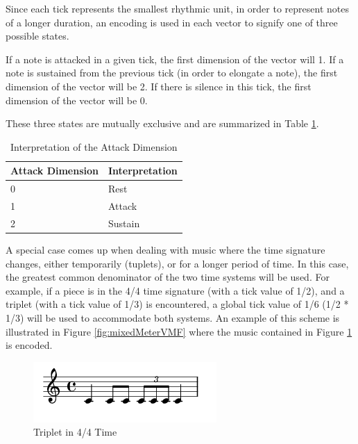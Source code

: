 Since each tick represents the smallest rhythmic unit, in order to represent notes of a longer duration, an encoding is used in each vector to signify one of three possible states.

If a note is attacked in a given tick, the first dimension of the vector will 1. If a note is sustained from the previous tick (in order to elongate a note), the first dimension of the vector will be 2. If there is silence in this tick, the first dimension of the vector will be 0.

These three states are mutually exclusive and are summarized in Table \ref{tab:attackBits}.

\begin{table}[h]
  \centering
  \begin{tabular}{ll}
  Attack Dimension & Interpretation \\ \hline
  0          & Rest             \\
  1          & Attack              \\
  2          & Sustain           \\
  \end{tabular}
  \caption{Interpretation of the Attack Dimension}
  \label{tab:attackBits}
\end{table}

A special case comes up when dealing with music where the time signature changes, either temporarily (tuplets), or for a longer period of time. In this case, the greatest common denominator of the two time systems will be used. For example, if a piece is in the 4/4 time signature (with a tick value of 1/2), and a triplet (with a tick value of 1/3) is encountered, a global tick value of 1/6 (1/2 * 1/3) will be used to accommodate both systems. An example of this scheme is illustrated in Figure \ref{fig:mixedMeterVMF} where the music contained in Figure \ref{fig:mixedMeterWestern} is encoded.

\begin{figure}
  \begin{center}
    \includegraphics[scale=0.75]{lilypond/mixedMeter}
    \caption{Triplet in 4/4 Time}
    \label{fig:mixedMeterWestern}
  \end{center}
\end{figure}

